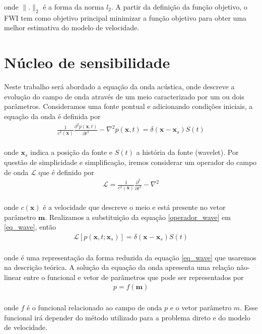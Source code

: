 onde $\|.\|_{2}$ é a forma da norma ${l}_{2}$. A partir da definição da função objetivo, o FWI tem como objetivo principal minimizar a função objetivo para obter uma melhor estimativa do modelo de velocidade.
\section{Núcleo de sensibilidade}


Neste trabalho será abordado a equação da onda acústica, onde descreve a evolução do campo de onda através de um meio caracterizado por um ou dois parâmetros. Consideramos uma fonte pontual e adicionando condições iniciais, a equação da onda é definida por\\
\begin{eqnarray}
\frac{1}{c^{2}(\mathbf{x})} \frac{\partial^{2} p(\mathbf{x},t)}{\partial t^{2}} - \nabla^{2}p(\mathbf{x},t) = \delta(\mathbf{x}-\mathbf{x}_{s}) S(t) 
\label{eq_wave}
\end{eqnarray}
\\
onde $\mathbf{x}_{s}$ indica a posição da fonte e $S(t)$ a história da fonte (wavelet). Por questão de simplicidade e simplificação, iremos considerar um operador do campo de onda $\mathcal{L}$ que é definido por \\
\begin{eqnarray}
     \mathcal{L} = \frac{1}{c^{2}(\mathbf{x})} \frac{\partial^{2} }{\partial t^{2}} - \nabla^{2}
     \label{operador_wave}
\end{eqnarray}
\\
onde $c(\mathbf{x})$ é a velocidade que descreve o meio e está presente no vetor parâmetro $\mathbf{m}$. Realizamos a substituição da equação \ref{operador_wave} em \ref{eq_wave}, então \\

\begin{eqnarray}
      \mathcal{L}\left[p(\mathbf{x},t;\mathbf{x}_{s})\right] = \delta(\mathbf{x}-\mathbf{x}_{s}) S(t)
      \label{l_wave}
\end{eqnarray}
\\
onde é uma representação da forma reduzida da equação \ref{eq_wave} que usaremos na descrição teórica. A solução da equação da onda apresenta uma relação não-linear entre o funcional e vetor de parâmetros que pode ser representados por \\
\begin{eqnarray}
 p = f (\mathbf{m})
 \label{funcional_p}
\end{eqnarray}
\\
onde $f$ é o funcional relacionado ao campo de onda $p$ e o vetor parâmetro $m$. Esse funcional irá depender do método utilizado para a problema direto e do modelo de velocidade. \\


